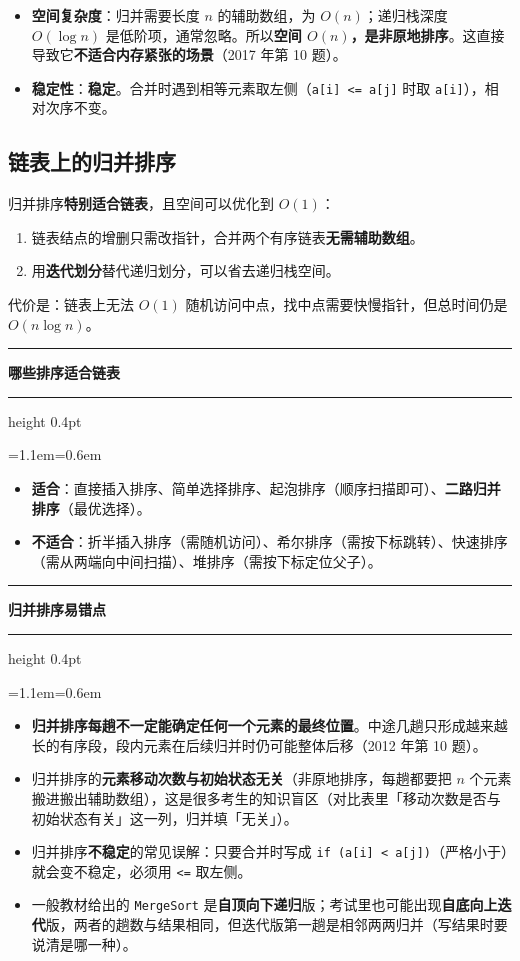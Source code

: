 \documentclass[11pt,openany,UTF8]{ctexbook}
\newcommand{\callouthead}[2]{%
  \par\addvspace{7pt}\noindent
  {\color{#1}\rule[-0.15em]{3pt}{1.05em}}\hspace{0.5em}%
  {\bfseries\color{#1}#2}\par\nobreak\vspace{-0.35em}%
  {\color{rulesep}\hrule height 0.4pt}\nobreak\vspace{0.45em}%
  \begingroup\small\setlength{\parindent}{0pt}%
  \leftskip=1.1em\rightskip=0.6em\noindent\ignorespaces}
\newcommand{\calloutend}{\par\endgroup\addvspace{7pt}}
\newenvironment{callkey}[1]{\callouthead{keybar}{#1}}{\calloutend}
\newenvironment{callwarn}[1]{\callouthead{warnbar}{#1}}{\calloutend}
\begin{document}
\begin{itemize}
\item \textbf{空间复杂度}：归并需要长度 $n$ 的辅助数组，为 $O(n)$；递归栈深度 $O(\log n)$ 是低阶项，通常忽略。所以\textbf{空间 $O(n)$，是非原地排序}。这直接导致它\textbf{不适合内存紧张的场景}（2017 年第 10 题）。
\item \textbf{稳定性}：\textbf{稳定}。合并时遇到相等元素取左侧（\texttt{a[i]\allowbreak{} <\allowbreak{}=\allowbreak{} a[j]\allowbreak{}} 时取 \texttt{a[i]\allowbreak{}}），相对次序不变。
\end{itemize}
\subsection{链表上的归并排序}

归并排序\textbf{特别适合链表}，且空间可以优化到 $O(1)$：

\begin{enumerate}
\item 链表结点的增删只需改指针，合并两个有序链表\textbf{无需辅助数组}。
\item 用\textbf{迭代划分}替代递归划分，可以省去递归栈空间。
\end{enumerate}
代价是：链表上无法 $O(1)$ 随机访问中点，找中点需要快慢指针，但总时间仍是 $O(n\log n)$。

\begin{callkey}{哪些排序适合链表}
\begin{itemize}
\item \textbf{适合}：直接插入排序、简单选择排序、起泡排序（顺序扫描即可）、\textbf{二路归并排序}（最优选择）。
\item \textbf{不适合}：折半插入排序（需随机访问）、希尔排序（需按下标跳转）、快速排序（需从两端向中间扫描）、堆排序（需按下标定位父子）。
\end{itemize}
\end{callkey}

\begin{callwarn}{归并排序易错点}
\begin{itemize}
\item \textbf{归并排序每趟不一定能确定任何一个元素的最终位置}。中途几趟只形成越来越长的有序段，段内元素在后续归并时仍可能整体后移（2012 年第 10 题）。
\item 归并排序的\textbf{元素移动次数与初始状态无关}（非原地排序，每趟都要把 $n$ 个元素搬进搬出辅助数组），这是很多考生的知识盲区（对比表里「移动次数是否与初始状态有关」这一列，归并填「无关」）。
\item 归并排序\textbf{不稳定}的常见误解：只要合并时写成 \texttt{if (a[i]\allowbreak{} <\allowbreak{} a[j]\allowbreak{})\allowbreak{}}（严格小于）就会变不稳定，必须用 \texttt{<\allowbreak{}=\allowbreak{}} 取左侧。
\item 一般教材给出的 \texttt{MergeSort} 是\textbf{自顶向下递归}版；考试里也可能出现\textbf{自底向上迭代}版，两者的趟数与结果相同，但迭代版第一趟是相邻两两归并（写结果时要说清是哪一种）。
\end{itemize}
\end{callwarn}
\end{document}
